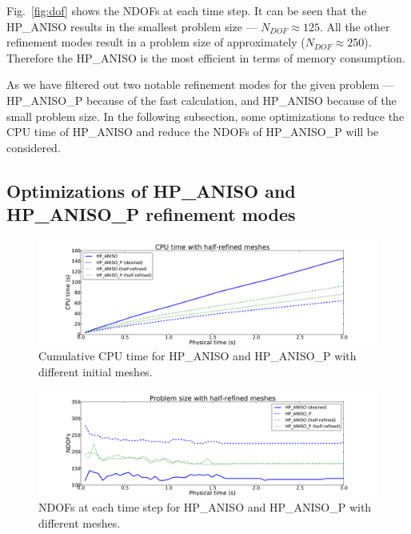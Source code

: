 Fig.~\ref{fig:dof} shows the NDOFs at each time step.
It can be seen that the HP\_ANISO results in the 
smallest problem size --- $N_{DOF} \approx 125$. 
All the other refinement modes result in a 
problem size of approximately ($N_{DOF} \approx 250$). Therefore
the HP\_ANISO is the most efficient in terms of memory consumption.

As we have filtered out
two notable refinement modes for the given problem --- HP\_ANISO\_P because of the fast
calculation, and HP\_ANISO because of the small problem size. In the following
subsection, some optimizations to reduce the CPU time of
HP\_ANISO and reduce the NDOFs of HP\_ANISO\_P will be considered.


\subsection{Optimizations of HP\_ANISO and HP\_ANISO\_P refinement modes}

\begin{figure}[!ht]
  \begin{centering}
  \includegraphics[width=\columnwidth]{refined_cpu}
  \caption{\label{fig:refined-cpu} Cumulative CPU time for HP\_ANISO and HP\_ANISO\_P
  with different initial meshes.}
  \end{centering}
\end{figure}

\begin{figure}[!ht]
  \begin{centering}
  \includegraphics[width=\columnwidth]{refined_dof}
  \caption{\label{fig:refined-dof} NDOFs at each time step for
  HP\_ANISO and HP\_ANISO\_P with different meshes.}
  \end{centering}
\end{figure}

